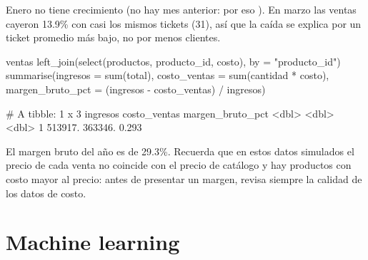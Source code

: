 Enero no tiene crecimiento (no hay mes anterior: por eso ). En
marzo las ventas cayeron 13.9\% con casi los mismos tickets (31), así que la
caída se explica por un ticket promedio más bajo, no por menos clientes.

\begin{rcode}[title={Margen bruto global}]
ventas %
  left_join(select(productos, producto_id, costo), by = "producto_id") %
  summarise(ingresos = sum(total),
            costo_ventas = sum(cantidad * costo),
            margen_bruto_pct = (ingresos - costo_ventas) / ingresos)
\end{rcode}
\begin{rsalida}
# A tibble: 1 x 3
  ingresos costo_ventas margen_bruto_pct
     <dbl>        <dbl>            <dbl>
1  513917.      363346.            0.293
\end{rsalida}

El margen bruto del año es de 29.3\%. Recuerda que en estos datos simulados
el precio de cada venta no coincide con el precio de catálogo y hay
productos con costo mayor al precio: antes de presentar un margen, revisa
siempre la calidad de los datos de costo.

\section{Machine learning}
\label{sec:ap-b-ml}

